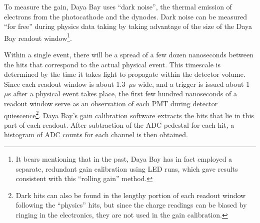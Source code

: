 \documentclass[../thesis.tex]{subfiles}
\begin{document}
To measure the gain, Daya Bay uses ``dark noise'', the thermal emission of electrons from the photocathode and the dynodes. Dark noise can be measured ``for free'' during physics data taking by taking advantage of the size of the Daya Bay readout window\footnote{It bears mentioning that in the past, Daya Bay has in fact employed a separate, redundant gain calibration using LED runs, which gave results consistent with this ``rolling gain'' method.}.
\begin{comment}
  \footnote{(WRONG) Each dynode can of course also emit electrons, but the collected charge is attenuated by $\mathcal{O}(5^n)$ for emission from the $n$th dynode. This effect can therefore be safely neglected for our purposes. NOTE: This can't be the reason. A 1/5-scale effect is certainly relevant if dynode thermal emission happens often enough. I believe the actual reason for only considering photocathode emission is that it's the only material that emits electrons at a significant rate (thanks to its work function?).}
\end{comment}
Within a single event, there will be a spread of a few dozen nanoseconds between the hits that correspond to the actual physical event. This timescale is determined by the time it takes light to propagate within the detector volume. Since each readout window is about 1.3~$\mu$s wide, and a trigger is issued about 1~$\mu$s after a physical event takes place, the first few hundred nanoseconds of a readout window serve as an observation of each PMT during detector quiescence\footnote{Dark hits can also be found in the lengthy portion of each readout window following the ``physics'' hits, but since the charge readings can be biased by ringing in the electronics, they are not used in the gain calibration.}. Daya Bay's gain calibration software extracts the hits that lie in this part of each readout. After subtraction of the ADC pedestal for each hit, a histogram of ADC counts for each channel is then obtained.
\end{document}
